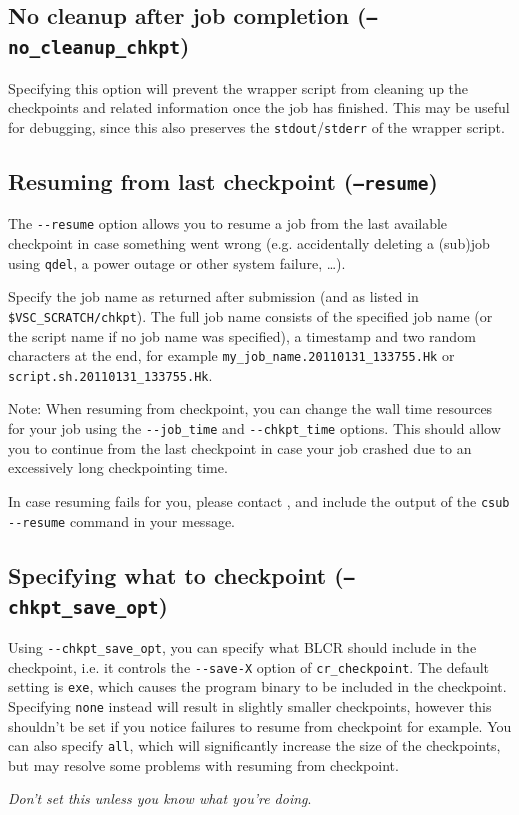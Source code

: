 \subsection{No cleanup after job completion (\texttt{--no\_cleanup\_chkpt})}

Specifying this option will prevent the wrapper script from cleaning up the
checkpoints and related information once the job has finished. This may be useful
for debugging, since this also preserves the \lstinline|stdout|/\lstinline|stderr|
of the wrapper script.

\subsection{Resuming from last checkpoint (\texttt{--resume})}

The \lstinline|--resume| option allows you to resume a job from the
last available checkpoint in case something went wrong
(e.g. accidentally deleting a (sub)job using \lstinline|qdel|, a power outage or other system failure, \ldots).

Specify the job name as returned after submission (and as listed in \texttt{\$VSC\_SCRATCH/chkpt}).
The full job name consists of the specified job name (or the script name if no job name was specified),
a timestamp and two random characters at the end, for example \lstinline|my_job_name.20110131_133755.Hk|
or \lstinline|script.sh.20110131_133755.Hk|.

Note: When resuming from checkpoint, you can change the wall time resources for your job using the \lstinline|--job_time| and
\lstinline|--chkpt_time| options. This should allow you to continue from the last checkpoint
in case your job crashed due to an excessively long checkpointing time.

In case resuming fails for you, please contact \hpcinfo, and include the output
of the \lstinline|csub --resume| command in your message.

\subsection{Specifying what to checkpoint (\texttt{--chkpt\_save\_opt})}

Using \lstinline|--chkpt_save_opt|, you can specify what BLCR should include in
the checkpoint, i.e. it controls the \lstinline|--save-X| option of \lstinline|cr_checkpoint|.
The default setting is \lstinline|exe|, which causes the program binary to be included in the
checkpoint. Specifying \lstinline|none| instead will result in slightly smaller checkpoints,
however this shouldn't be set if you notice failures to resume from checkpoint
for example. You can also specify \lstinline|all|, which will significantly increase the size
of the checkpoints, but may resolve some problems with resuming from checkpoint.

\emph{Don't set this unless you know what you're doing}.
